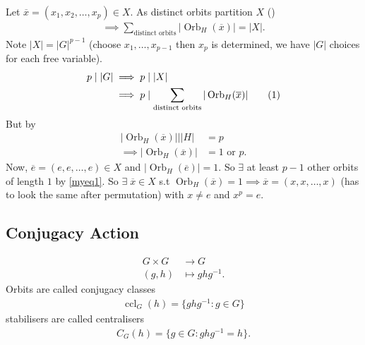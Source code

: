 Let $\overline{x} = (x_1, x_2, \ldots, x_p) \in X$.
As distinct orbits partition $X$ ()
\begin{align*}
    \implies \sum_{\text{distinct orbits}} |\operatorname{Orb}_H(\overline{x})| = |X|. 
\end{align*} 
Note $|X| = |G|^{p - 1}$ (choose $x_1, \ldots, x_{p-1}$ then $x_p$ is determined, we have $|G|$ choices for each free variable).
\begin{align*}
    p \mid |G| \implies p &\mid |X| \\
    \implies p &\mid \sum_{\text{distinct orbits}} |\operatorname{Orb}_H(\overline{x})| \stepcounter{equation}\tag{\theequation}\label{myeq1} \\
\end{align*} 
But by 
\begin{align*}
    |\operatorname{Orb}_H(\overline{x})| \bigg| |H| &= p \\
    \implies |\operatorname{Orb}_H(\overline{x})| &= 1 \text{ or } p.
\end{align*} 
Now, $\overline{e} = (e, e, \ldots, e) \in X$ and $|\operatorname{Orb}_H(\overline{e}) | = 1$.
So $\exists$ at least $p - 1$ other orbits of length $1$ by \eqref{myeq1}.
So $\exists \; \overline{x} \in X$ s.t $\operatorname{Orb}_H(\overline{x}) = 1 \implies \overline{x} = (x, x, \ldots, x)$ (has to look the same after permutation) with $x \neq e$ and $x^p = e$.

\subsection{Conjugacy Action}

\begin{align*}
    G \times G &\to G \\
    (g, h) &\mapsto g h g^{-1}.
\end{align*} 
Orbits are called conjugacy classes
\begin{align*}
    \operatorname{ccl}_G(h) = \{ g h g^{-1} : g \in G\}
\end{align*} 
stabilisers are called centralisers
\begin{align*}
    C_G(h) = \{g \in G : g h g^{-1} = h\}.
\end{align*} 


